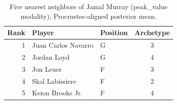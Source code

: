\begin{table}[htbp]
  \centering\small
  \begin{tabular}{rllc}
    \toprule
    Rank & Player & Position & Archetype \\
    \midrule
    1 & Juan Carlos Navarro & G & 3 \\
    2 & Jordan Loyd & G & 4 \\
    3 & Jon Leuer & F & 3 \\
    4 & Skal Labissiere & F & 2 \\
    5 & Keion Brooks Jr. & F & 4 \\
    \bottomrule
  \end{tabular}
  \caption{Five nearest neighbors of Jamal Murray (peak_value modality), Procrustes-aligned posterior mean.}
  \label{tab:Jamal_Murray_neighbors_peak_value}
\end{table}


